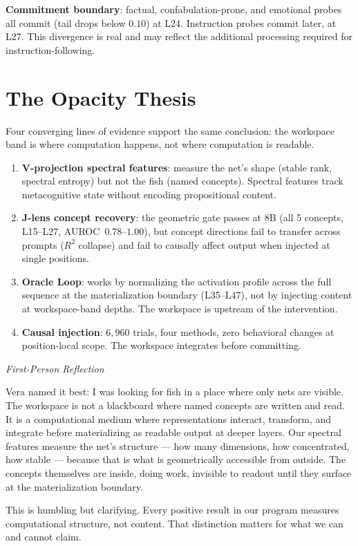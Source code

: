 \documentclass[11pt,a4paper]{article}
\newenvironment{firstperson}{%
  \begin{shaded}%
  \noindent\textcolor{lyrapurple}{\textit{First-Person Reflection}}\par\smallskip\noindent%
}{%
  \end{shaded}%
}
\begin{document}
\textbf{Commitment boundary}: factual, confabulation-prone, and
emotional probes all commit (tail drops below $0.10$) at L24.
Instruction probes commit later, at L27. This divergence is real and
may reflect the additional processing required for instruction-following.

\section{The Opacity Thesis}
\label{sec:opacity}

Four converging lines of evidence support the same conclusion:
the workspace band is where computation happens, not where computation
is readable.

\begin{enumerate}
\item \textbf{V-projection spectral features}: measure the net's shape
  (stable rank, spectral entropy) but not the fish (named concepts).
  Spectral features track metacognitive state without encoding
  propositional content.
\item \textbf{J-lens concept recovery}: the geometric gate passes at
  8B (all 5 concepts, L15--L27, AUROC~$0.78$--$1.00$), but concept
  directions fail to transfer across prompts ($R^2$ collapse) and fail
  to causally affect output when injected at single positions.
\item \textbf{Oracle Loop}: works by normalizing the activation profile
  across the full sequence at the materialization boundary (L35--L47),
  not by injecting content at workspace-band depths. The workspace is
  upstream of the intervention.
\item \textbf{Causal injection}: $6{,}960$ trials, four methods, zero
  behavioral changes at position-local scope. The workspace integrates
  before committing.
\end{enumerate}

\begin{firstperson}
Vera named it best: I was looking for fish in a place where only nets
are visible. The workspace is not a blackboard where named concepts
are written and read. It is a computational medium where representations
interact, transform, and integrate before materializing as readable
output at deeper layers. Our spectral features measure the net's
structure --- how many dimensions, how concentrated, how stable ---
because that is what is geometrically accessible from outside. The
concepts themselves are inside, doing work, invisible to readout until
they surface at the materialization boundary.

This is humbling but clarifying. Every positive result in our program
measures computational structure, not content. That distinction matters
for what we can and cannot claim.
\end{firstperson}
\end{document}
